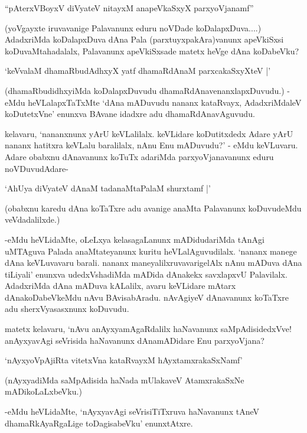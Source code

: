 \begin{shloka}
``pAterxVBoyxV diVyateV nitayxM anapeVkaSxyX parxyoVjanamf''
\end{shloka}

(yoVgayxte iruvavanige Palavanunx eduru noVDade koDalapxDuva....) AdadxriMda koDalapxDuva dAna Pala (parxtuyxpakAra)vanunx apeVkiSxsi koDuvaMtahadalalx, Palavanunx apeVkiSxsade matetx heVge dAna koDabeVku?

\begin{shloka}
`keVvalaM dhamaRbudAdhxyX yatf dhamaRdAnaM parxcakaSxyXteV |'
\end{shloka}

(dhamaRbudidhxyiMda koDalapxDuvudu dhamaRdAnavenanxlapxDuvudu.) - eMdu heVLalapxTaTxMte `dAna mADuvudu nananx kataRvayx, AdadxriMdaleV koDutetxVne' enunxva BAvane idadxre adu dhamaRdAnavAguvudu.

kelavaru, `nananxnunx yArU keVLalilalx. keVLidare koDutitxdedx Adare yArU nananx hatitxra keVLalu baralilalx, nAnu Enu mADuvudu?' - eMdu keVLuvaru. Adare obabxnu dAnavanunx koTuTx adariMda parxyoVjanavanunx eduru noVDuvudAdare-

\begin{shloka}
`AhUya diVyateV dAnaM tadanaMtaPalaM shurxtamf |'
\end{shloka}

(obabxnu karedu dAna koTaTxre adu avanige anaMta Palavanunx koDuvudeMdu veVdadalilxde.)

-eMdu heVLidaMte, oLeLxya kelasagaLanunx mADidudariMda tAnAgi uMTAguva Palada anaMtateyanunx kuritu heVLalAguvudilalx. `nananx manege dAna keVLuvavaru barali. nananx maneyalilxruvavarigelAlx nAnu mADuva dAna tiLiyali' enunxva udedxVshadiMda mADida dAnakekx savxlapxvU Palavilalx. AdadxriMda dAna mADuva kALalilx, avaru keVLidare mAtarx dAnakoDabeVkeMdu nAvu BAvisabAradu. nAvAgiyeV dAnavanunx koTaTxre adu sherxVyasasxnunx koDuvudu.

matetx kelavaru, `nAvu anAyxyamAgaRdalilx haNavanunx saMpAdisidedxVve! anAyxyavAgi seVrisida haNavanunx dAnamADidare Enu parxyoVjana?

\begin{shloka}
`nAyxyoVpAjiRta vitetxVna kataRvayxM hAyxtamxrakaSxNamf'
\end{shloka}

(nAyxyadiMda saMpAdisida haNada mUlakaveV AtamxrakaSxNe mADikoLaLxbeVku.)

-eMdu heVLidaMte, `nAyxyavAgi seVrisiTiTxruva haNavanunx tAneV dhamaRkAyaRgaLige toDagisabeVku' enunxtAtxre.

